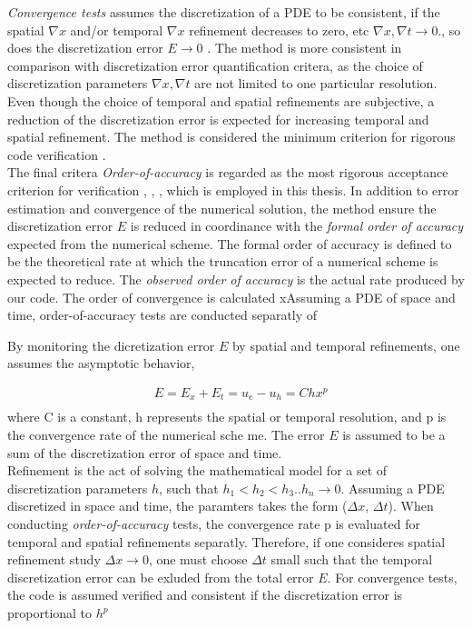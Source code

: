 \textit{Convergence tests} assumes the discretization of a PDE to be consistent, if the spatial $\nabla x$ and/or temporal $\nabla x$ refinement decreases to zero, etc $\nabla x, \nabla t \rightarrow 0$., so does the discretization error $E  \rightarrow 0$ \cite{Biggs}. The method is  more consistent in comparison with discretization error quantification critera, as the choice of discretization parameters $\nabla x, \nabla t$ are not limited to one particular  resolution. Even though the choice of temporal and spatial refinements are subjective, a reduction of the discretization error is expected for increasing temporal and spatial refinement. The method is considered the minimum criterion for rigorous code verification \cite{Roache}. \\
The final critera \textit{Order-of-accuracy}  is regarded as the most rigorous acceptance criterion for verification \cite{Biggs}, \cite{Roache}, \cite{Etienne2006}, which is employed in this thesis. In addition to error estimation and convergence of the numerical solution, the method ensure the discretization error $E$ is reduced in coordinance with the \textit{formal order of accuracy} expected from the numerical scheme. The formal order of accuracy is defined to be the theoretical rate at which the truncation error of a numerical scheme is expected to reduce. The \textit{observed order of accuracy} is the actual rate produced by our code. The order of convergence is calculated  xAssuming a PDE of space and time, order-of-accuracy tests are conducted separatly of 

By monitoring the dicretization error $E$ by spatial and temporal refinements, one assumes the asymptotic behavior,

\begin{align*}
&E = E_x + E_t = u_e - u_h = C hx^p \\
\end{align*} 
where C is a constant, h represents the spatial or temporal resolution, and p is the convergence rate of the numerical sche
me. The error $E$ is assumed to be a sum of the discretization error of space and time. \\ 
Refinement is the act of solving the mathematical model for a set of discretization parameters $h$, such that
$h_1 < h_2 < h_3 .. h_n \rightarrow 0$. Assuming a PDE discretized in space and time, the paramters takes the form ($\Delta x$, $\Delta t$). 
When conducting \textit{order-of-accuracy} tests, the convergence rate p is evaluated for temporal and spatial refinements separatly. Therefore, if one consideres spatial refinement study $\Delta x \rightarrow 0$, one must choose $\Delta t$ small such that the temporal discretization error can be exluded from the total error $E$.    
For convergence tests, the code is assumed verified and consistent if the discretization error is proportional to $h^p$

